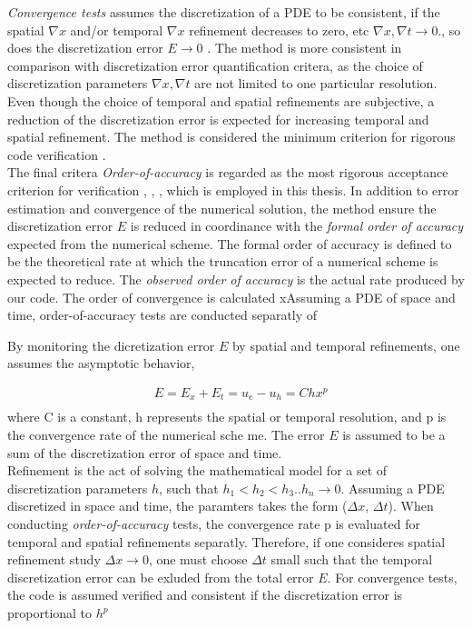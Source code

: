 \textit{Convergence tests} assumes the discretization of a PDE to be consistent, if the spatial $\nabla x$ and/or temporal $\nabla x$ refinement decreases to zero, etc $\nabla x, \nabla t \rightarrow 0$., so does the discretization error $E  \rightarrow 0$ \cite{Biggs}. The method is  more consistent in comparison with discretization error quantification critera, as the choice of discretization parameters $\nabla x, \nabla t$ are not limited to one particular  resolution. Even though the choice of temporal and spatial refinements are subjective, a reduction of the discretization error is expected for increasing temporal and spatial refinement. The method is considered the minimum criterion for rigorous code verification \cite{Roache}. \\
The final critera \textit{Order-of-accuracy}  is regarded as the most rigorous acceptance criterion for verification \cite{Biggs}, \cite{Roache}, \cite{Etienne2006}, which is employed in this thesis. In addition to error estimation and convergence of the numerical solution, the method ensure the discretization error $E$ is reduced in coordinance with the \textit{formal order of accuracy} expected from the numerical scheme. The formal order of accuracy is defined to be the theoretical rate at which the truncation error of a numerical scheme is expected to reduce. The \textit{observed order of accuracy} is the actual rate produced by our code. The order of convergence is calculated  xAssuming a PDE of space and time, order-of-accuracy tests are conducted separatly of 

By monitoring the dicretization error $E$ by spatial and temporal refinements, one assumes the asymptotic behavior,

\begin{align*}
&E = E_x + E_t = u_e - u_h = C hx^p \\
\end{align*} 
where C is a constant, h represents the spatial or temporal resolution, and p is the convergence rate of the numerical sche
me. The error $E$ is assumed to be a sum of the discretization error of space and time. \\ 
Refinement is the act of solving the mathematical model for a set of discretization parameters $h$, such that
$h_1 < h_2 < h_3 .. h_n \rightarrow 0$. Assuming a PDE discretized in space and time, the paramters takes the form ($\Delta x$, $\Delta t$). 
When conducting \textit{order-of-accuracy} tests, the convergence rate p is evaluated for temporal and spatial refinements separatly. Therefore, if one consideres spatial refinement study $\Delta x \rightarrow 0$, one must choose $\Delta t$ small such that the temporal discretization error can be exluded from the total error $E$.    
For convergence tests, the code is assumed verified and consistent if the discretization error is proportional to $h^p$

